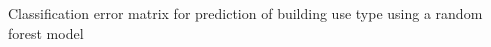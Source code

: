 Classification error matrix for prediction of building use type using a random forest model
\label{fig:use_classification}